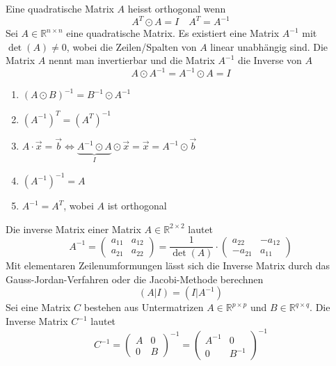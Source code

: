 Eine quadratische Matrix $A$ heisst orthogonal wenn
\begin{equation}
\boxed{A^T\odot A=I}\quad \boxed{A^T=A^{-1}}
\end{equation}
Sei $A\in\mathbb{R}^{n\times n}$ eine quadratische Matrix. Es existiert eine Matrix $A^{-1}$ mit $\det\left(A\right)\neq 0$, wobei die Zeilen/Spalten von $A$ linear unabhängig sind. Die Matrix $A$ nennt man invertierbar und die Matrix $A^{-1}$ die Inverse von $A$
\begin{equation}
\boxed{A\odot A^{-1}=A^{-1}\odot A=I}
\end{equation}
\begin{enumerate}[$(i)$]
\item $\left(A\odot B\right)^{-1}=B^{-1}\odot A^{-1}$
\item $\left(A^{-1}\right)^T=\left(A^T\right)^{-1}$
\item $A\cdot \overrightarrow{x}=\overrightarrow{b}\Leftrightarrow \underbrace{ A^{-1}\odot A}_{I}\odot \overrightarrow{x}=\overrightarrow{x}=A^{-1}\odot\overrightarrow{b}$
\item $\left(A^{-1}\right)^{-1}=A$
\item $A^{-1}=A^T$, wobei $A$ ist orthogonal
\end{enumerate}
Die inverse Matrix einer Matrix $A\in\mathbb{R}^{2\times 2}$ lautet
\begin{equation}
\boxed{A^{-1}=\begin{pmatrix}a_{11}&a_{12}\\a_{21}&a_{22}\end{pmatrix}=\dfrac{1}{\det\left(A\right)}\cdot \begin{pmatrix}a_{22}&-a_{12}\\-a_{21}&a_{11}\end{pmatrix}}
\end{equation}
Mit elementaren Zeilenumformungen lässt sich die Inverse Matrix durch das Gauss-Jordan-Verfahren oder die Jacobi-Methode berechnen
\begin{equation}
\boxed{\left(A\Big\vert I\right)=\left(I\Big\vert A^{-1}\right)}
\end{equation}
Sei eine Matrix $C$ bestehen aus Untermatrizen $A\in\mathbb{R}^{p\times p}$ und $B\in\mathbb{R}^{q\times q}$. Die Inverse Matrix $C^{-1}$ lautet
\begin{equation} 
\boxed{C^{-1}=\begin{pmatrix}A&0\\0&B\end{pmatrix}^{-1}=\begin{pmatrix}A^{-1}&0\\0&B^{-1}\end{pmatrix}^{-1}}
\end{equation} 
